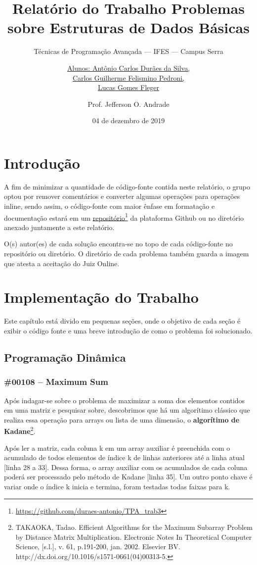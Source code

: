 \documentclass[a4paper,12pt]{scrartcl}
\title{Relatório do Trabalho Problemas sobre Estruturas de Dados Básicas}
\subtitle{Técnicas de Programação Avançada --- IFES --- Campus Serra}
\author{
    \uline{
        Alunos: Antônio Carlos Durães da Silva,
        \\Carlos Guilherme Felismino Pedroni,
        \\Lucas Gomes Fleger}
  \and Prof. Jefferson O. Andrade}
\date{04 de dezembro de 2019}
\begin{document}
\maketitle
\tableofcontents 
\listoflistings
\listoffigures

\section{Introdução}

A fim de minimizar a quantidade de código-fonte contida neste relatório, o grupo optou por remover comentários e converter algumas operações para operações inline, sendo assim, o código-fonte com maior ênfase em formatação e documentação estará em um \href{https://github.com/duraes-antonio/TPA_trab4}{repositório}\footnote{\url{https://github.com/duraes-antonio/TPA_trab3}} da plataforma Github ou no diretório anexado juntamente a este relatório.

O(s) autor(es) de cada solução encontra-se no topo de cada código-fonte no repositório ou diretório. O diretório de cada problema também guarda a imagem que atesta a aceitação do Juiz Online.

\section{Implementação do Trabalho}

Este capítulo está divido em pequenas seções, onde o objetivo de cada seção é exibir o código fonte e uma breve introdução de como o problema foi solucionado.

\subsection{Programação Dinâmica}
\subsubsection{\#00108 – Maximum Sum}
Após indagar-se sobre o problema de maximizar a soma dos elementos contidos em uma matriz e pesquisar sobre, descobrimos que há um algorítimo clássico que realiza essa operação para arrays ou lista de uma dimensão, o \textbf{algorítimo de Kadane}\footnote{TAKAOKA, Tadao. Efficient Algorithms for the Maximum Subarray Problem by Distance Matrix Multiplication. Electronic Notes In Theoretical Computer Science, [s.l.], v. 61, p.191-200, jan. 2002. Elsevier BV. http://dx.doi.org/10.1016/s1571-0661(04)00313-5.}.

Após ler a matriz, cada coluna k em um array auxiliar é preenchida com o acumulado de todos elementos de índice k de linhas anteriores até a linha atual [linha 28 a 33]. Dessa forma, o array auxiliar com os acumulados de cada coluna poderá ser processado pelo método de Kadane [linha 35]. Um outro ponto chave é variar onde o índice k inicia e termina, foram testadas todas faixas para k.
\end{document}
